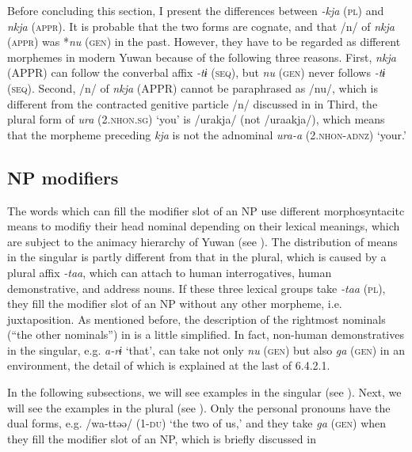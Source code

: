   Before concluding this section, I present the differences between \textit{-kja} (\textsc{pl}) and \textit{nkja} (\textsc{appr}). It is probable that the two forms are cognate, and that /n/ of \textit{nkja} (\textsc{appr}) was *\textit{nu} (\textsc{gen}) in the past. However, they have to be regarded as different morphemes in modern Yuwan because of the following three reasons. First, \textit{nkja} (APPR) can follow the converbal affix \textit{-tɨ} (\textsc{seq}), but \textit{nu} (\textsc{gen}) never follows \textit{-tɨ} (\textsc{seq}). Second, /n/ of \textit{nkja} (APPR) cannot be paraphrased as /nu/, which is different from the contracted genitive particle /n/ discussed in  in  Third, the plural form of \textit{ura} (2.\textsc{nhon}.\textsc{sg}) ‘you’ is /urakja/ (not /uraakja/), which means that the morpheme preceding \textit{kja} is not the adnominal \textit{ura-a} (2.\textsc{nhon}-\textsc{adnz}) ‘your.’

\subsection{NP modifiers}

The words which can fill the modifier slot of an NP use different morphosyntacitc means to modifiy their head nominal depending on their lexical meanings, which are subject to the animacy hierarchy of Yuwan (see ). The distribution of means in the singular is partly different from that in the plural, which is caused by a plural affix \textit{-taa}, which can attach to human interrogatives, human demonstrative, and address nouns. If these three lexical groups take \textit{-taa} (\textsc{pl}), they fill the modifier slot of an NP without any other morpheme, i.e. juxtaposition. As mentioned before, the description of the rightmost nominals (“the other nominals”) in  is a little simplified. In fact, non-human demonstratives in the singular, e.g. \textit{a-rɨ} ‘that’, can take not only \textit{nu} (\textsc{gen}) but also \textit{ga} (\textsc{gen}) in an environment, the detail of which is explained at the last of 6.4.2.1.

In the following subsections, we will see examples in the singular (see ). Next, we will see the examples in the plural (see ). Only the personal pronouns have the dual forms, e.g. /wa-ttəə/ (1-\textsc{du}) ‘the two of us,’ and they take \textit{ga} (\textsc{gen}) when they fill the modifier slot of an NP, which is briefly discussed in 

